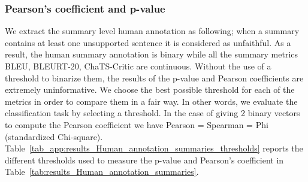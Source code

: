 \subsubsection{Pearson’s coefficient and p-value}
\label{app:results_Human_annotation_summaries_thresholds}
We extract the summary level human annotation as following; when a summary contains at least one unsupported sentence it is considered as unfaithful. As a result, the human summary annotation is binary while all the summary metrics BLEU, BLEURT-20, ChaTS-Critic are continuous. Without the use of a threshold to binarize them, the results of the p-value and Pearson coefficients are extremely uninformative. We choose the best possible threshold for each of the metrics in order to compare them in a fair way. In other words, we evaluate the classification task by selecting a threshold.
In the case of giving 2 binary vectors to compute the Pearson coefficient we have  Pearson = Spearman = Phi (standardized Chi-square). Table~\ref{tab_app:results_Human_annotation_summaries_thresholds} reports the different thresholds used to measure the p-value and Pearson’s coefficient in Table~\ref{tab:results_Human_annotation_summaries}.
\begin{table}
\centering
{}
\caption{The thresholds used to report the values in Table~\ref{tab:results_Human_annotation_summaries} were selected as follows. For all metrics except for \metric{}, we looked for the best threshold that maximized first the chance of observing a lower p-value and then a higher person coefficient. A constant threshold was considered for all sets when using \metric{}.}
\label{tab_app:results_Human_annotation_summaries_thresholds} 
\end{table}

